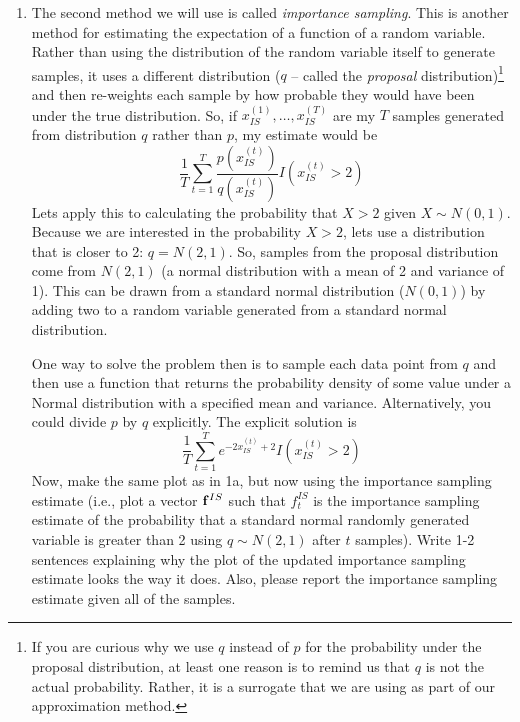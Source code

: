 \documentclass[11pt]{article}
\begin{document}
\begin{enumerate}
\begin{enumerate}
 \item The second method we will use is called {\em importance sampling}. This is another method for estimating the expectation of a function of a random variable. Rather than using the distribution of the random variable itself to generate samples, it uses a different distribution ($q$ -- called the {\em proposal} distribution)\footnote{If you are curious why we use $q$ instead of $p$ for the probability under the proposal distribution, at least one reason is to remind us that $q$ is not the actual probability. Rather, it is a surrogate that we are using as part of our approximation method.} and then re-weights each sample by how probable they would have been under the true distribution. So, if $x_{IS}^{(1)},\dotsc,x_{IS}^{(T)}$ are my $T$ samples generated from distribution $q$ rather than $p$, my estimate would be
 \begin{equation*}
 \frac{1}{T}\sum_{t=1}^T{\frac{p\left(x_{IS}^{(t)} \right) }{q\left(x_{IS}^{(t)}\right) } I\left(x_{IS}^{(t)}>2 \right) }
 \end{equation*}
 Lets apply this to calculating the probability that $X > 2$ given $X \sim N(0,1)$. Because we are interested in the probability $X > 2$, lets use a distribution that is closer to 2: $q=N(2,1)$. So, samples from the proposal distribution come from $N(2,1)$ (a normal distribution with a mean of 2 and variance of 1). This can be drawn from a standard normal distribution ($N(0,1)$) by adding two to a random variable generated from a standard normal distribution.

One way to solve the problem then is to sample each data point from $q$ and then use a function that returns the probability density of some value under a Normal distribution with a specified mean and variance. Alternatively, you could divide $p$ by $q$ explicitly. The explicit solution is
 \begin{equation*}
 \frac{1}{T}\sum_{t=1}^T{ e^{-2 x_{IS}^{(t)} +2 } I (x_{IS}^{(t)} > 2)}
 \end{equation*}
Now, make the same plot as in 1a, but now using the importance sampling estimate (i.e., plot a vector ${\bf f}^{IS}$ such that $f_t^{IS}$ is the importance sampling estimate of the probability that a standard normal randomly generated variable is greater than 2 using $q \sim N(2,1)$ after $t$ samples). Write 1-2 sentences explaining why the plot of the updated importance sampling estimate looks the way it does. Also, please report the importance sampling estimate given all of the samples.


\end{enumerate}
\end{enumerate}
\end{document}

